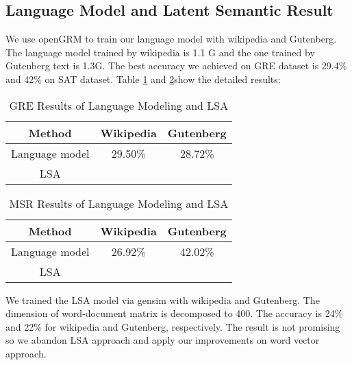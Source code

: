 \documentclass[11pt]{article}
\begin{document}
\subsection{Language Model and Latent Semantic Result}
We use openGRM to train our language model with wikipedia and Gutenberg. The language model trained by wikipedia is 1.1 G and the one trained by Gutenberg text is 1.3G. The  best accuracy we achieved on GRE dataset is 29.4$\%$ and 42$\%$ on SAT dataset. Table \ref{tab:gre}  and \ref{tab:MSR}show the detailed results:\\
\begin{table}[h]
\centering
\begin{tabular}{|c|c|c|}
\hline
Method & Wikipedia & Gutenberg \\
\hline
Language model &29.50\% & 28.72\% \\
\hline
LSA & &  \\
\hline
\end{tabular}
\caption{GRE Results of Language Modeling and LSA}
\label{tab:gre}
\end{table}
\begin{table}[h]
\begin{tabular}{|c|c|c|}
\hline
Method & Wikipedia & Gutenberg \\
\hline
Language model & 26.92\% & 42.02\% \\
\hline
LSA & &  \\
\hline
\end{tabular}
\caption{MSR Results of Language Modeling and LSA}
\label{tab:MSR}
\end{table}

We trained the LSA model via gensim with wikipedia and Gutenberg. The dimension of word-document matrix is decomposed to 400. The accuracy is 24$\%$ and 22$\%$ for wikipedia and Gutenberg, respectively. The result is not promising so we abandon LSA approach and apply our improvements on word vector approach. 
\end{document}
